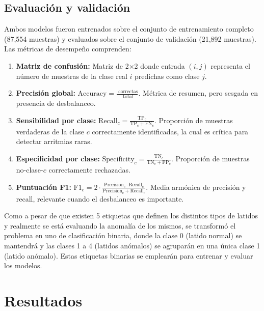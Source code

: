 \documentclass[a4paper,twocolumn]{article}
\begin{document}
	\subsection{Evaluación y validación}

	Ambos modelos fueron entrenados sobre el conjunto de entrenamiento completo (87,554 muestras) y evaluados sobre el conjunto de validación (21,892 muestras). Las métricas de desempeño comprenden:

	\begin{enumerate}
		\item \textbf{Matriz de confusión:} Matriz de 2×2 donde entrada $(i,j)$ representa el número de muestras de la clase real $i$ predichas como clase $j$.
		
		\item \textbf{Precisión global:} $\text{Accuracy} = \frac{\text{ correctas}}{\text{ total}}$. Métrica de resumen, pero sesgada en presencia de desbalanceo.
		
		\item \textbf{Sensibilidad por clase:} $\text{Recall}_c = \frac{\text{TP}_c}{\text{TP}_c + \text{FN}_c}$. Proporción de muestras verdaderas de la clase $c$ correctamente identificadas, la cual es crítica para detectar arritmias raras.
		
		\item \textbf{Especificidad por clase:} $\text{Specificity}_c = \frac{\text{TN}_c}{\text{TN}_c + \text{FP}_c}$. Proporción de muestras no-clase-$c$ correctamente rechazadas.
		
		\item \textbf{Puntuación F1:} $\text{F1}_c = 2 \cdot \frac{\text{Precision}_c \cdot \text{Recall}_c}{\text{Precision}_c + \text{Recall}_c}$. Media armónica de precisión y recall, relevante cuando el desbalanceo es importante.
	\end{enumerate}

	\vspace{0.2cm}

Como a pesar de que existen 5 etiquetas que definen los distintos tipos de latidos y realmente se está evaluando la anomalía de los mismos, se transformó el problema en uno de clasificación binaria, donde la clase 0 (latido normal) se mantendrá y las clases 1 a 4 (latidos anómalos) se agruparán en una única clase 1 (latido anómalo). Estas etiquetas binarias se emplearán para entrenar y evaluar los modelos.

	\section{Resultados}
	\label{sec:resultados}
\end{document}
